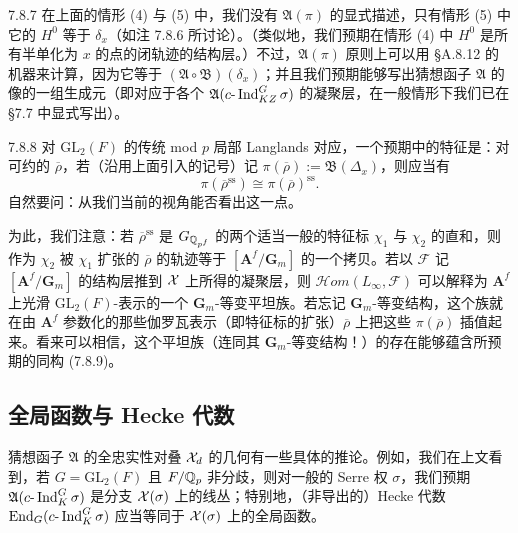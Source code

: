 \begin{rem}{7.8.7}\label{rem:a4-7-8-7}
在上面的情形 (4) 与 (5) 中，我们没有 $\mathfrak A(\pi)$ 的显式描述，只有情形 (5) 中它的 $H^0$ 等于 $\delta_x$（如注 7.8.6 所讨论）。（类似地，我们预期在情形 (4) 中 $H^0$ 是所有半单化为 $x$ 的点的闭轨迹的结构层。）不过，$\mathfrak A(\pi)$ 原则上可以用 §A.8.12 的机器来计算，因为它等于 $(\mathfrak A\circ\mathfrak B)(\delta_x)$；并且我们预期能够写出猜想函子 $\mathfrak A$ 的像的一组生成元（即对应于各个 $\mathfrak A(c\text{-}\operatorname{Ind}_{KZ}^G\sigma)$ 的凝聚层，在一般情形下我们已在 §7.7 中显式写出）。
\end{rem}

\begin{rem}{7.8.8}\label{rem:a4-7-8-8}
对 $\mathrm{GL}_2(F)$ 的传统 mod $p$ 局部 Langlands 对应，一个预期中的特征是：对可约的 $\overline{\rho}$，若（沿用上面引入的记号）记 $\pi(\overline{\rho}):=\mathfrak B(\Delta_x)$，则应当有
\begin{equation}\tag{7.8.9}\label{eq:a4-7-8-9}
\pi(\overline{\rho}^{\mathrm{ss}})\cong\pi(\overline{\rho})^{\mathrm{ss}}.
\end{equation}
自然要问：从我们当前的视角能否看出这一点。

为此，我们注意：若 $\overline{\rho}^{\mathrm{ss}}$ 是 $G_{\mathbb{Q}_{p^f}}$ 的两个适当一般的特征标 $\chi_1$ 与 $\chi_2$ 的直和，则作为 $\chi_2$ 被 $\chi_1$ 扩张的 $\overline{\rho}$ 的轨迹等于 $[\mathbf A^f/\mathbf G_m]$ 的一个拷贝。若以 $\mathcal F$ 记 $[\mathbf A^f/\mathbf G_m]$ 的结构层推到 $\mathcal{X}$ 上所得的凝聚层，则 $\mathcal Hom(L_\infty,\mathcal F)$ 可以解释为 $\mathbf A^f$ 上光滑 $\mathrm{GL}_2(F)$-表示的一个 $\mathbf G_m$-等变平坦族。若忘记 $\mathbf G_m$-等变结构，这个族就在由 $\mathbf A^f$ 参数化的那些伽罗瓦表示（即特征标的扩张）$\overline{\rho}$ 上把这些 $\pi(\overline{\rho})$ 插值起来。看来可以相信，这个平坦族（连同其 $\mathbf G_m$-等变结构！）的存在能够蕴含所预期的同构 (7.8.9)。
\end{rem}

\subsection{全局函数与 Hecke 代数}
猜想函子 $\mathfrak A$ 的全忠实性对叠 $\mathcal{X}_d$ 的几何有一些具体的推论。例如，我们在上文看到，若 $G=\mathrm{GL}_2(F)$ 且 $F/\mathbb{Q}_p$ 非分歧，则对一般的 Serre 权 $\sigma$，我们预期 $\mathfrak A(c\text{-}\operatorname{Ind}_K^G\sigma)$ 是分支 $\mathcal{X}(\sigma)$ 上的线丛；特别地，（非导出的）Hecke 代数 $\operatorname{End}_G(c\text{-}\operatorname{Ind}_K^G\sigma)$ 应当等同于 $\mathcal{X}(\sigma)$ 上的全局函数。

